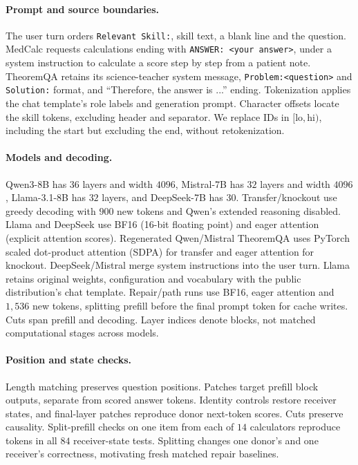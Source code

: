 \paragraph{Prompt and source boundaries.}
The user turn orders \texttt{Relevant Skill:}, skill text, a blank line
and the question. MedCalc requests calculations ending with
\texttt{ANSWER: <your answer>}, under a system instruction to calculate
a score step by step from a patient note. TheoremQA retains its
science-teacher system message, \texttt{Problem:<question>} and
\texttt{Solution:} format, and ``Therefore, the answer is ...'' ending.
Tokenization applies the chat template's role labels and generation prompt.
Character offsets locate the skill tokens, excluding header and separator.
We replace IDs in $[\mathrm{lo},\mathrm{hi})$, including the start but
excluding the end, without retokenization.

\paragraph{Models and decoding.}
Qwen3-8B has $36$ layers and width $4096$, Mistral-7B has $32$ layers and
width $4096$, Llama-3.1-8B has $32$ layers, and DeepSeek-7B has $30$.
Transfer/knockout use greedy decoding with $900$ new tokens and Qwen's
extended reasoning disabled. Llama and DeepSeek use BF16 (16-bit
floating point) and eager attention (explicit attention scores).
Regenerated Qwen/Mistral TheoremQA uses PyTorch scaled dot-product
attention (SDPA) for transfer and eager attention for knockout.
DeepSeek/Mistral merge system instructions into the user turn. Llama
retains original weights, configuration and vocabulary with the public
distribution's chat template. Repair/path runs use BF16, eager attention
and $1{,}536$ new tokens, splitting prefill before the final prompt token
for cache writes. Cuts span prefill and decoding. Layer indices denote
blocks, not matched computational stages across models.

\paragraph{Position and state checks.}
Length matching preserves question positions. Patches target prefill block
outputs, separate from scored answer tokens. Identity controls restore
receiver states, and final-layer patches reproduce donor next-token scores.
Cuts preserve causality. Split-prefill checks on one item from each of $14$
calculators reproduce tokens in all $84$ receiver-state tests. Splitting
changes one donor's and one receiver's correctness, motivating fresh
matched repair baselines.

